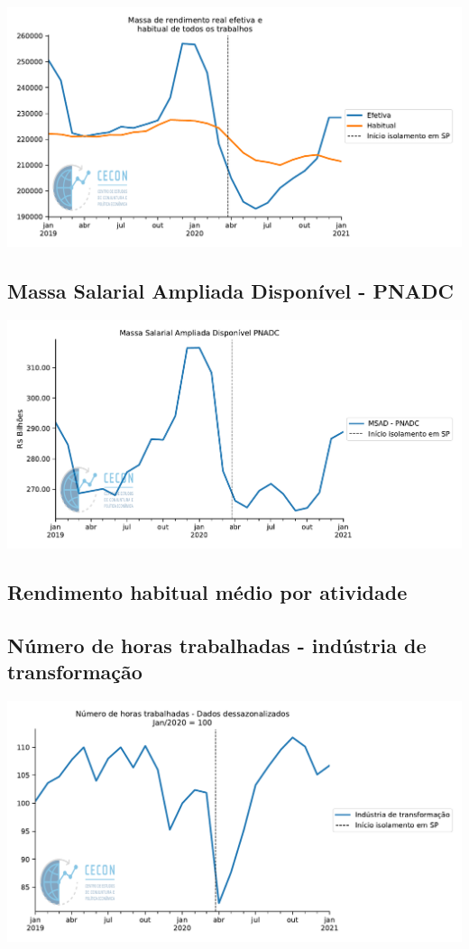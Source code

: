 \documentclass{SelfArx}
\begin{document}
\begin{center}
\includegraphics[width=.9\linewidth]{./figs/Emprego/MRR_Efetiva_Habitual.pdf}
\end{center}

\subsection*{Massa Salarial Ampliada Disponível - PNADC}
\label{sec:org68ed89c}

\begin{center}
\includegraphics[width=.9\linewidth]{./figs/Emprego/MSAD.pdf}
\end{center}

\subsection*{Rendimento habitual médio por atividade}
\label{sec:org835a232}

\subsection*{Número de horas trabalhadas - indústria de transformação}
\label{sec:org8276d8a}

\begin{center}
\includegraphics[width=.9\linewidth]{./figs/Emprego/Horas_Transformacao.pdf}
\end{center}
\end{document}
